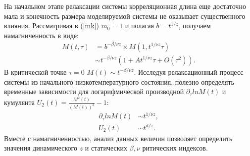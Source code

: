 \documentclass[12pt,a4paper]{article}
\begin{document}
На начальном этапе релаксации системы корреляционная длина еще достаточно мала и конечность размера моделируемой системы не оказывает существенного влияния. Рассматривая в (\ref{mk}) $m_0 = 1$ и полагая $b = t^{1/z}$, получаем намагниченность в виде:
\begin{equation} \label{mupr}
\begin{split}
M \left( t, \tau \right) & = b^{- \beta / \nu z } \times M\left( 1, t^{1/\nu z}\tau \right) \\
       & \sim t^{- \beta / \nu z} \left(1 + At^{1/\nu z}\tau + O(\tau^2) \right).
\end{split}
\end{equation}
В критической точке $\tau = 0 $ $M(t) \sim t^{- \beta / \nu z}$. Исследуя релаксационный процесс системы из начального низкотемпературного состояния, полезно определять временные зависимости для логарифмической производной $\partial_{\tau} ln M(t)$ и кумулянта $U_{2}(t)=\frac{M^{2}(t)}{(M(t))^2} - 1$:
\begin{equation} \label{utwo}
\begin{split}
\partial_{\tau} ln M(t) & \sim t^{1/\nu z}, \\
        U_{2}(t) & \sim t^{d/z}.
\end{split}
\end{equation}
Вместе с намагниченностью, анализ данных величин позволяет определить значения динамического $z$ и статических $\beta, \nu$ ритических индексов.
\end{document}
